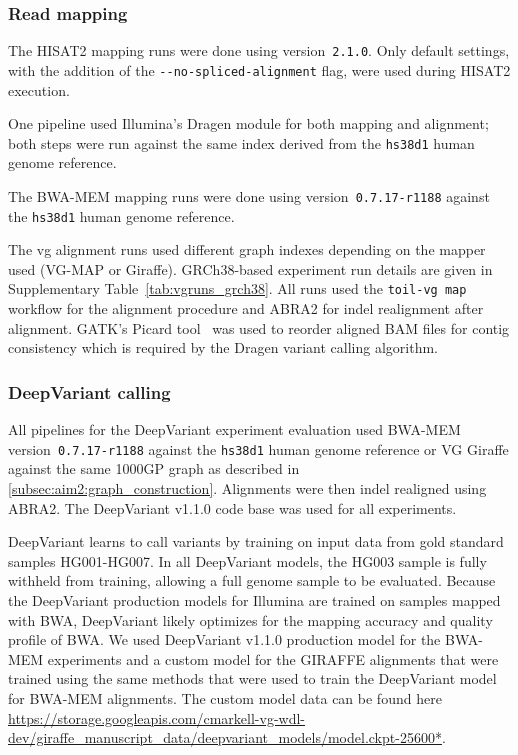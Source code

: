 \documentclass[11pt]{ucscthesis}
\begin{document}
\subsubsection{Read mapping}
The HISAT2 mapping runs were done using version~\texttt{2.1.0}.
Only default settings, with the addition of the \texttt{-{}-no-spliced-alignment} flag, were used during HISAT2 execution.

One pipeline used Illumina's Dragen module for both mapping and alignment; both steps were run against the same index derived from the \texttt{hs38d1} human genome reference.

The BWA-MEM mapping runs were done using version~\texttt{0.7.17-r1188} against the \texttt{hs38d1} human genome reference.

The vg alignment runs used different graph indexes depending on the mapper used (VG-MAP or Giraffe).
GRCh38-based experiment run details are given in Supplementary Table~\ref{tab:vgruns_grch38}.
All runs used the \texttt{toil-vg~map} workflow for the alignment procedure and ABRA2\cite{mose2019improved} for indel realignment after alignment.
GATK's Picard tool~\cite{Picard2019toolkit} was used to reorder aligned BAM files for contig consistency which is required by the Dragen variant calling algorithm.


\subsubsection{DeepVariant calling}
\label{subsec:aim2:deepvariant_calling}

All pipelines for the DeepVariant experiment evaluation used BWA-MEM version~\texttt{0.7.17-r1188} against the \texttt{hs38d1} human genome reference or VG Giraffe against the same 1000GP graph as described in \ref{subsec:aim2:graph_construction}.
Alignments were then indel realigned using ABRA2\cite{mose2019improved}.
The DeepVariant v1.1.0 code base was used for all experiments.

DeepVariant learns to call variants by training on input data from gold standard samples HG001-HG007.
In all DeepVariant models, the HG003 sample is fully withheld from training, allowing a full genome sample to be evaluated.
Because the DeepVariant production models for Illumina are trained on samples mapped with BWA, DeepVariant likely optimizes for the mapping accuracy and quality profile of BWA.
We used DeepVariant v1.1.0 production model for the BWA-MEM experiments and a custom model for the GIRAFFE alignments that were trained using the same methods that were used to train the DeepVariant model for BWA-MEM alignments.
The custom model data can be found here \url{https://storage.googleapis.com/cmarkell-vg-wdl-dev/giraffe_manuscript_data/deepvariant_models/model.ckpt-25600*}.
\end{document}

